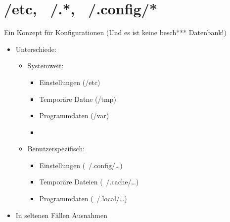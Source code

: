 \section[/etc, ~/.*]{/etc, ~/.*, ~/.config/*}
\begin{frame}{Ein Konzept für Konfigurationen \tiny (Und es ist keine besch*** Datenbank!)}
\begin{itemize}
\item Unterschiede:
	\begin{itemize}
	\item Systemweit:
		\begin{itemize}
		\item Einstellungen (/etc)
		\item Temporäre Datne (/tmp)
		\item Programmdaten (/var)
		\item 
		\end{itemize}
	\item Benutzerspezifisch:
	\begin{itemize}
		\item Einstellungen (~/.config/…)
		\item Temporäre Dateien (~/.cache/…)
		\item Programmdaten (~/.local/…)	
	\end{itemize}
	\end{itemize}
\item In seltenen Fällen Ausnahmen
\end{itemize}
\end{frame}